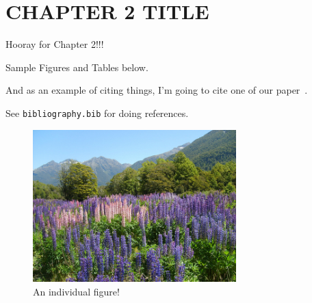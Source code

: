 \chapter{CHAPTER 2 TITLE}
\label{chap:chapter_2}

Hooray for Chapter 2!!!

Sample Figures and Tables below.

And as an example of citing things, I'm going to cite one of our paper~\cite{LAC_first}. 

See \verb|bibliography.bib| for doing references.

\begin{figure}[h]
	\centering
	\includegraphics[width=0.7\textwidth]{./Plots/nature.jpg}
	\caption{An individual figure!}
\end{figure}
        
